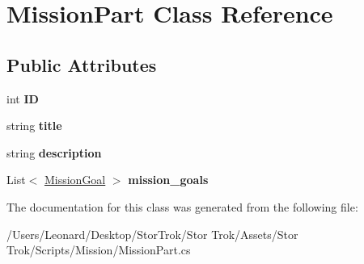 \hypertarget{class_mission_part}{}\section{Mission\+Part Class Reference}
\label{class_mission_part}
\subsection*{Public Attributes}
\begin{DoxyCompactItemize}
\item 
\mbox{\label{class_mission_part_a7e3b429a941f86f1ee3ea2744413c097}} 
int {\bfseries ID}
\item 
\mbox{\label{class_mission_part_a815fed1039a22528fa2e67349a9e7e84}} 
string {\bfseries title}
\item 
\mbox{\label{class_mission_part_a1f79bfaa4907bb57f8d92318953f0cac}} 
string {\bfseries description}
\item 
\mbox{\label{class_mission_part_ac0d1ca7919c1752e38c464cc2d7545a6}} 
List$<$ \hyperlink{class_mission_goal}{Mission\+Goal} $>$ {\bfseries mission\+\_\+goals}
\end{DoxyCompactItemize}


The documentation for this class was generated from the following file\+:\begin{DoxyCompactItemize}
\item 
/\+Users/\+Leonard/\+Desktop/\+Stor\+Trok/\+Stor Trok/\+Assets/\+Stor Trok/\+Scripts/\+Mission/Mission\+Part.\+cs\end{DoxyCompactItemize}
